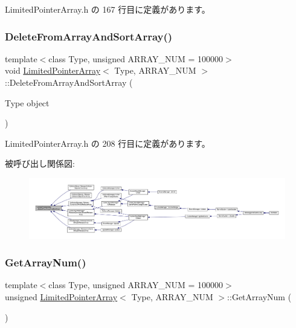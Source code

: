  Limited\+Pointer\+Array.\+h の 167 行目に定義があります。

\mbox{\label{class_limited_pointer_array_a32dd58543bee490df6dcea079ebe4586}} 
\subsubsection{\texorpdfstring{Delete\+From\+Array\+And\+Sort\+Array()}{DeleteFromArrayAndSortArray()}}
{\footnotesize\ttfamily template$<$class Type, unsigned A\+R\+R\+A\+Y\+\_\+\+N\+UM = 100000$>$ \\
void \mbox{\hyperlink{class_limited_pointer_array}{Limited\+Pointer\+Array}}$<$ Type, A\+R\+R\+A\+Y\+\_\+\+N\+UM $>$\+::Delete\+From\+Array\+And\+Sort\+Array (\begin{DoxyParamCaption}\item[{Type}]{object }\end{DoxyParamCaption})\hspace{0.3cm}{\ttfamily [inline]}}



 Limited\+Pointer\+Array.\+h の 208 行目に定義があります。

被呼び出し関係図\+:
\nopagebreak
\begin{figure}[H]
\begin{center}
\leavevmode
\includegraphics[width=350pt]{class_limited_pointer_array_a32dd58543bee490df6dcea079ebe4586_icgraph}
\end{center}
\end{figure}
\mbox{\label{class_limited_pointer_array_a404c188412a49f58ecacabd41c974de2}} 
\subsubsection{\texorpdfstring{Get\+Array\+Num()}{GetArrayNum()}}
{\footnotesize\ttfamily template$<$class Type, unsigned A\+R\+R\+A\+Y\+\_\+\+N\+UM = 100000$>$ \\
unsigned \mbox{\hyperlink{class_limited_pointer_array}{Limited\+Pointer\+Array}}$<$ Type, A\+R\+R\+A\+Y\+\_\+\+N\+UM $>$\+::Get\+Array\+Num (\begin{DoxyParamCaption}{ }\end{DoxyParamCaption})\hspace{0.3cm}{\ttfamily [inline]}}



